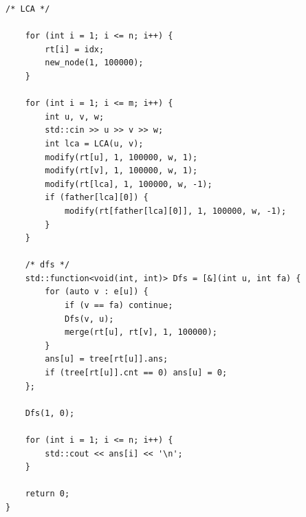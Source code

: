 \documentclass[UTF8, a4paper, titlepage, twoside]{ctexart}
\begin{document}
\begin{lstlisting}[style=cpp]
    /* LCA */

    for (int i = 1; i <= n; i++) {
        rt[i] = idx;
        new_node(1, 100000);
    }

    for (int i = 1; i <= m; i++) {
        int u, v, w;
        std::cin >> u >> v >> w;
        int lca = LCA(u, v);
        modify(rt[u], 1, 100000, w, 1);
        modify(rt[v], 1, 100000, w, 1);
        modify(rt[lca], 1, 100000, w, -1);
        if (father[lca][0]) {
            modify(rt[father[lca][0]], 1, 100000, w, -1);
        }
    }

    /* dfs */
    std::function<void(int, int)> Dfs = [&](int u, int fa) {
        for (auto v : e[u]) {
            if (v == fa) continue;
            Dfs(v, u);
            merge(rt[u], rt[v], 1, 100000);
        }
        ans[u] = tree[rt[u]].ans;
        if (tree[rt[u]].cnt == 0) ans[u] = 0;
    };

    Dfs(1, 0);

    for (int i = 1; i <= n; i++) {
        std::cout << ans[i] << '\n';
    }

    return 0;
}
\end{lstlisting}
\end{document}
